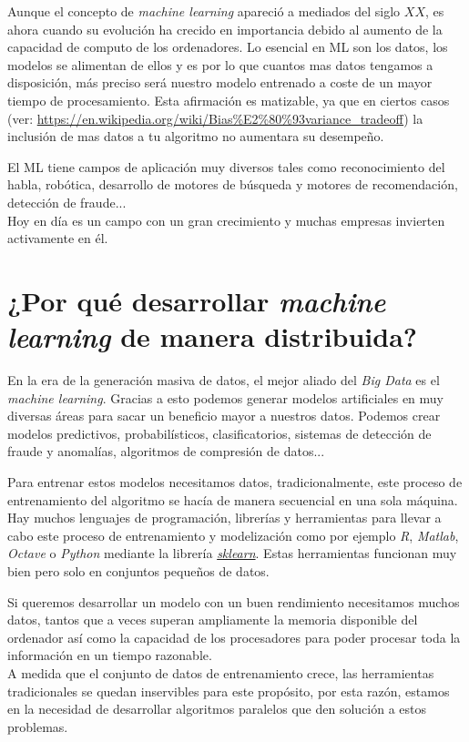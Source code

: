 Aunque el concepto de \textit{machine learning} apareció a mediados del siglo $XX$, es ahora cuando su evolución
ha crecido en importancia debido al aumento de la capacidad de computo de los ordenadores.
Lo esencial en ML son los datos, los modelos se alimentan de ellos y es por lo que cuantos mas
datos tengamos a disposición, más preciso será nuestro modelo entrenado a coste de un mayor
tiempo de procesamiento. Esta afirmación es matizable, ya que en ciertos casos 
(ver: \url{https://en.wikipedia.org/wiki/Bias%E2%80%93variance_tradeoff})
la inclusión de mas datos a tu algoritmo no aumentara su desempeño.
\newline

El ML tiene campos de aplicación muy diversos tales como reconocimiento del habla, robótica,
desarrollo de motores de búsqueda y motores de recomendación, detección de fraude...\\
Hoy en día es un campo con un gran crecimiento y muchas empresas invierten activamente en él.

\section[\textit{Machine Learning} distribuido]{¿Por qué desarrollar \textit{machine learning} de manera distribuida?}
En la era de la generación masiva de datos, el mejor aliado del \textit{Big Data} es el \textit{machine learning}.
Gracias a esto podemos generar modelos artificiales en muy diversas áreas para sacar un beneficio
mayor a nuestros datos. Podemos crear modelos predictivos, probabilísticos, clasificatorios,
sistemas de detección de fraude y anomalías, algoritmos de compresión de datos...
\newline

Para entrenar estos modelos necesitamos datos, tradicionalmente, este proceso de entrenamiento
del algoritmo se hacía de manera secuencial en una sola máquina. Hay muchos lenguajes de programación, 
librerías y herramientas para llevar a cabo este proceso de entrenamiento y modelización como por
ejemplo \textit{R}, \textit{Matlab}, \textit{Octave} o \textit{Python} mediante la librería 
\href{http://scikit-learn.org/stable/}{\textit{sklearn}}.
Estas herramientas funcionan muy bien pero solo en conjuntos pequeños de datos.
\newline

Si queremos desarrollar un modelo con un buen rendimiento necesitamos muchos datos, tantos que a veces
superan ampliamente la memoria disponible del ordenador así como la capacidad de los procesadores para
poder procesar toda la información en un tiempo razonable.\\
A medida que el conjunto de datos de entrenamiento crece, las herramientas tradicionales se quedan
inservibles para este propósito, por esta razón, estamos en la necesidad de desarrollar algoritmos
paralelos que den solución a estos problemas.
\newline

